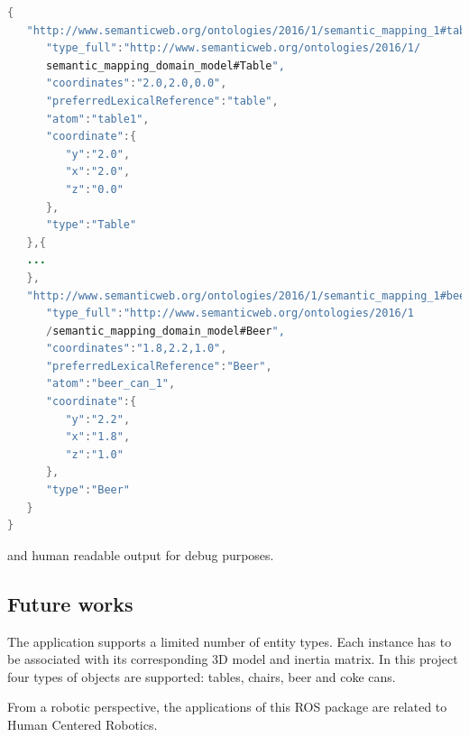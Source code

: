\begin{lstlisting}[language=Java]
{
   "http://www.semanticweb.org/ontologies/2016/1/semantic_mapping_1#table1":{
      "type_full":"http://www.semanticweb.org/ontologies/2016/1/
      semantic_mapping_domain_model#Table",
      "coordinates":"2.0,2.0,0.0",
      "preferredLexicalReference":"table",
      "atom":"table1",
      "coordinate":{
         "y":"2.0",
         "x":"2.0",
         "z":"0.0"
      },
      "type":"Table"
   },{
   ...
   },
   "http://www.semanticweb.org/ontologies/2016/1/semantic_mapping_1#beer_can_1":{
      "type_full":"http://www.semanticweb.org/ontologies/2016/1
      /semantic_mapping_domain_model#Beer",
      "coordinates":"1.8,2.2,1.0",
      "preferredLexicalReference":"Beer",
      "atom":"beer_can_1",
      "coordinate":{
         "y":"2.2",
         "x":"1.8",
         "z":"1.0"
      },
      "type":"Beer"
   }
}
\end{lstlisting}


and human readable output for debug purposes.  




\subsection{Future works}

The application supports a limited number of entity types. Each instance has to be associated with its corresponding 3D model and inertia matrix. In this project four types of objects are supported: tables, chairs, beer and coke cans.

From a robotic perspective, the applications of this ROS package are related to Human Centered Robotics.

